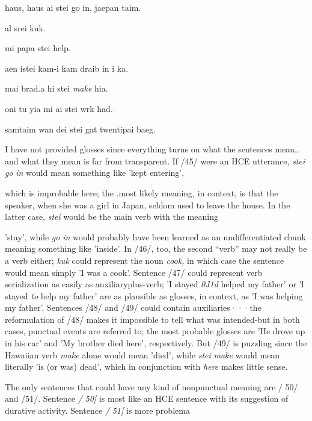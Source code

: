 \ea\label{ex:45}
 haus, haus ai stei go in, jaepan taim.
\glt
\z

\ea\label{ex:46}
 al srei kuk.
\glt
\z

\ea\label{ex:47}
 mi papa stei help.
\glt
\z

\ea\label{ex:48}
 aen istei kam-i kam draib in i ka.
\glt
\z

\ea\label{ex:49}
 mai brad.a hi stei \textit{make} hia.
\glt
\z

\ea\label{ex:50}
 oni tu yia mi ai stei wrk had.
\glt
\z

\ea\label{ex:51}
 samtaim wan dei stei gat twentipai baeg.
\glt
\z

I have not provided glosses since everything turns on what the sentences mean,. and what they mean is far from transparent. If /45/ were an HCE utterance, \textit{stei} \textit{go} \textit{in} would mean something like 'kept entering',

which is improbable here; the .most likely meaning, in context, is that the speaker, when she was a girl in Japan, seldom used to leave the house. In the latter case, \textit{stei} would be the main verb with the meaning

'stay', while \textit{go} \textit{in} would probably have been learned as an undifferenti\-ated chunk meaning something like 'inside'. In /46/, too, the second ``verb'' may not really be a verb either; \textit{kuk} could represent the noun \textit{cook,} in which case the sentence would mean simply 'I was a cook'. Sentence /47/ could represent verb serialization as easily as auxiliary\-plus-verb; 'I stayed \textit{0J1d} helped my father' or 'l stayed \textit{to} help my father' are as plausible as glosses, in context, as 'I was helping my father'. Sentences /48/ and /49/ could contain auxiliaries···the reformu\-lation of /48/ makes it impossible to tell what was intended-but in both cases, punctual events are referred to; the most probable glosses are 'He drove up in his car' and 'My brother died here', respectively. But /49/ is puzzling since the Hawaiian verb \textit{make} alone would mean 'died', while \textit{stei} \textit{make} would mean literally 'is (or was) dead', which in conjunction with \textit{here} makes little sense.


The only sentences that could have any kind of nonpunctual meaning are / 50/ and /51/. Sentence \textit{/} \textit{50[} is most like an HCE sentence with its suggestion of durative activity. Sentence \textit{/} \textit{51[} is more problema\-

